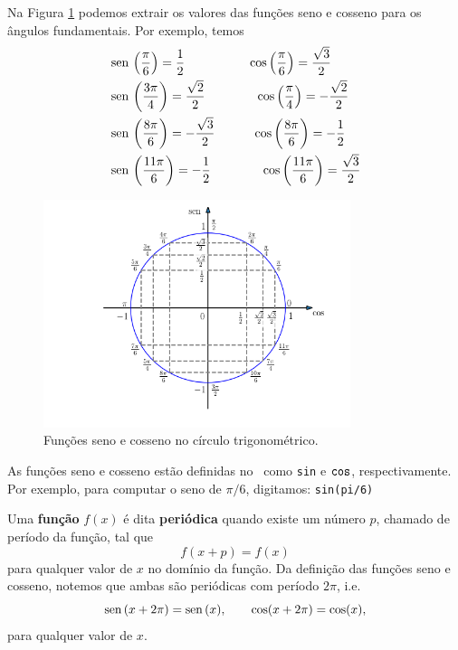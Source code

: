 \documentclass[../main.tex]{subfiles}
\begin{document}
Na Figura \ref{fig:cos_seno_valores} podemos extrair os valores das funções seno e cosseno para os ângulos fundamentais. Por exemplo, temos
\begin{align*}
  &\operatorname{sen}\,\left(\frac{\pi}{6}\right) = \frac{1}{2}\qquad\qquad\quad \cos\left(\frac{\pi}{6}\right) = \frac{\sqrt{3}}{2}\\
  &\operatorname{sen}\,\left(\frac{3\pi}{4}\right) = \frac{\sqrt{2}}{2}\qquad\qquad \cos\left(\frac{\pi}{4}\right) = -\frac{\sqrt{2}}{2}\\
  &\operatorname{sen}\,\left(\frac{8\pi}{6}\right) = -\frac{\sqrt{3}}{2}\qquad\quad \cos\left(\frac{8\pi}{6}\right) = -\frac{1}{2}\\
  &\operatorname{sen}\,\left(\frac{11\pi}{6}\right) = -\frac{1}{2}\qquad\qquad \cos\left(\frac{11\pi}{6}\right) = \frac{\sqrt{3}}{2}\\
\end{align*}
\begin{figure}[H]
  \centering
  \includegraphics[width=0.8\textwidth]{fig_func/fig_cos_seno_valores}
  \caption{Funções seno e cosseno no círculo trigonométrico.}
  \label{fig:cos_seno_valores}
\end{figure}
\dica As funções seno e cosseno estão definidas no \geogebra~como \verb+sin+ e $\verb+cos+$, respectivamente. Por exemplo, para computar o seno de $\pi/6$, digitamos: \verb+sin(pi/6)+

Uma {\bf função} $f(x)$ é dita {\bf periódica} quando existe um número $p$, chamado de período da função, tal que
\begin{equation}
  f(x+p) = f(x)
\end{equation}
para qualquer valor de $x$ no domínio da função. Da definição das funções seno e cosseno, notemos que ambas são periódicas com período $2\pi$, i.e.
\begin{equation}
  \operatorname{sen}\,(x+2\pi) = \operatorname{sen}\,(x),\qquad \cos(x+2\pi) = \cos(x),
\end{equation}
para qualquer valor de $x$.
\end{document}
